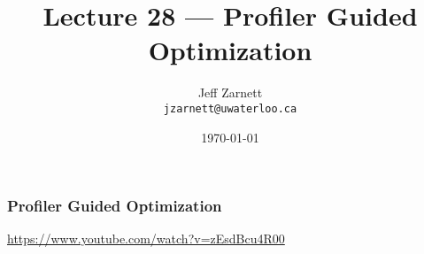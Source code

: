 

\title{Lecture 28 --- Profiler Guided Optimization }

\author{Jeff Zarnett \\ \small \texttt{jzarnett@uwaterloo.ca}}
\date{\today}




\begin{frame}
  \titlepage

 \end{frame}

\begin{frame}
\frametitle{Profiler Guided Optimization}

\begin{center}
\url{https://www.youtube.com/watch?v=zEsdBcu4R00}
\end{center}


\end{frame}



